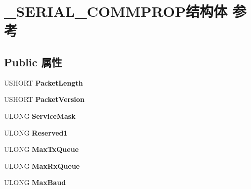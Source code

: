 \hypertarget{struct___s_e_r_i_a_l___c_o_m_m_p_r_o_p}{}\section{\+\_\+\+S\+E\+R\+I\+A\+L\+\_\+\+C\+O\+M\+M\+P\+R\+O\+P结构体 参考}
\label{struct___s_e_r_i_a_l___c_o_m_m_p_r_o_p}
\subsection*{Public 属性}
\begin{DoxyCompactItemize}
\item 
\mbox{\label{struct___s_e_r_i_a_l___c_o_m_m_p_r_o_p_acb300be8fc24f7f91ed0468a74ea7021}} 
U\+S\+H\+O\+RT {\bfseries Packet\+Length}
\item 
\mbox{\label{struct___s_e_r_i_a_l___c_o_m_m_p_r_o_p_a3d0d9321a109bd9d6f0cb6796253f193}} 
U\+S\+H\+O\+RT {\bfseries Packet\+Version}
\item 
\mbox{\label{struct___s_e_r_i_a_l___c_o_m_m_p_r_o_p_a0c38d2b9083bf67f51cd182a0cdac163}} 
U\+L\+O\+NG {\bfseries Service\+Mask}
\item 
\mbox{\label{struct___s_e_r_i_a_l___c_o_m_m_p_r_o_p_a385754c7431174d66d032fc6e674b090}} 
U\+L\+O\+NG {\bfseries Reserved1}
\item 
\mbox{\label{struct___s_e_r_i_a_l___c_o_m_m_p_r_o_p_a67e10739d809041732ec5c57dc7f127c}} 
U\+L\+O\+NG {\bfseries Max\+Tx\+Queue}
\item 
\mbox{\label{struct___s_e_r_i_a_l___c_o_m_m_p_r_o_p_a91a2d5db80be9df4e26a918a7717c0c2}} 
U\+L\+O\+NG {\bfseries Max\+Rx\+Queue}
\item 
\mbox{\label{struct___s_e_r_i_a_l___c_o_m_m_p_r_o_p_af2ccd381485cf7a4a21e078819ee314d}} 
U\+L\+O\+NG {\bfseries Max\+Baud}
\item 
\mbox{\label{struct___s_e_r_i_a_l___c_o_m_m_p_r_o_p_a21c884eafa0023d08e27601343ead19d}} 

\end{DoxyCompactItemize}
